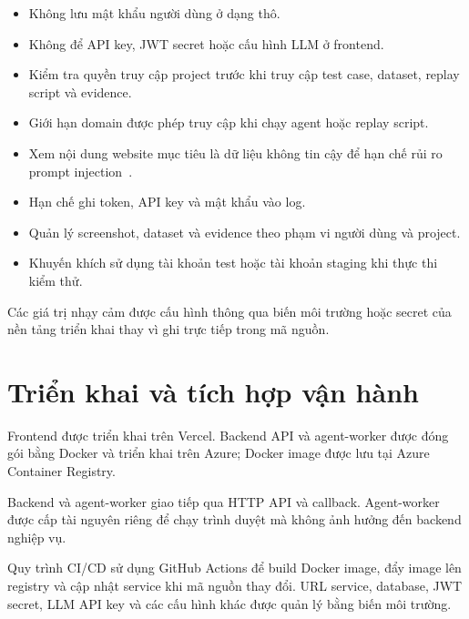 \begin{itemize}
    \item Không lưu mật khẩu người dùng ở dạng thô.
    
    \item Không để API key, JWT secret hoặc cấu hình LLM ở frontend.
    
    \item Kiểm tra quyền truy cập project trước khi truy cập test case, dataset, replay script và evidence.
    
    \item Giới hạn domain được phép truy cập khi chạy agent hoặc replay script.
    
    \item Xem nội dung website mục tiêu là dữ liệu không tin cậy để hạn chế rủi ro prompt injection~\cite{11359704}.
    
    \item Hạn chế ghi token, API key và mật khẩu vào log.
    
    \item Quản lý screenshot, dataset và evidence theo phạm vi người dùng và project.
    
    \item Khuyến khích sử dụng tài khoản test hoặc tài khoản staging khi thực thi kiểm thử.
\end{itemize}

Các giá trị nhạy cảm được cấu hình thông qua biến môi trường hoặc secret của nền tảng triển khai thay vì ghi trực tiếp trong mã nguồn.

\section{Triển khai và tích hợp vận hành}

Frontend được triển khai trên Vercel. Backend API và agent-worker được đóng gói bằng Docker và triển khai trên Azure; Docker image được lưu tại Azure Container Registry.

Backend và agent-worker giao tiếp qua HTTP API và callback. Agent-worker được cấp tài nguyên riêng để chạy trình duyệt mà không ảnh hưởng đến backend nghiệp vụ.

Quy trình CI/CD sử dụng GitHub Actions để build Docker image, đẩy image lên registry và cập nhật service khi mã nguồn thay đổi. URL service, database, JWT secret, LLM API key và các cấu hình khác được quản lý bằng biến môi trường.

